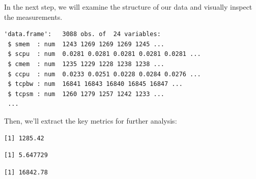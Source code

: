 In the next step, we will examine the structure of our data and visually
inspect the measurements.

\begin{Shaded}
\begin{Highlighting}[]
\end{Highlighting}
\end{Shaded}

\begin{verbatim}
'data.frame':   3088 obs. of  24 variables:
 $ smem  : num  1243 1269 1269 1269 1245 ...
 $ scpu  : num  0.0281 0.0281 0.0281 0.0281 0.0281 ...
 $ cmem  : num  1235 1229 1228 1238 1238 ...
 $ ccpu  : num  0.0233 0.0251 0.0228 0.0284 0.0276 ...
 $ tcpbw : num  16841 16843 16840 16845 16847 ...
 $ tcpsm : num  1260 1279 1257 1242 1233 ...
 ...
\end{verbatim}

Then, we'll extract the key metrics for further analysis:

\begin{Shaded}
\begin{Highlighting}[]
\SpecialCharTok{\$}
\end{Highlighting}
\end{Shaded}

\begin{verbatim}
[1] 1285.42
\end{verbatim}

\begin{Shaded}
\begin{Highlighting}[]
\SpecialCharTok{\$}
\end{Highlighting}
\end{Shaded}

\begin{verbatim}
[1] 5.647729
\end{verbatim}

\begin{Shaded}
\begin{Highlighting}[]
\SpecialCharTok{\$}
\end{Highlighting}
\end{Shaded}

\begin{verbatim}
[1] 16842.78
\end{verbatim}

\begin{Shaded}
\begin{Highlighting}[]
\SpecialCharTok{\$}
\end{Highlighting}
\end{Shaded}

